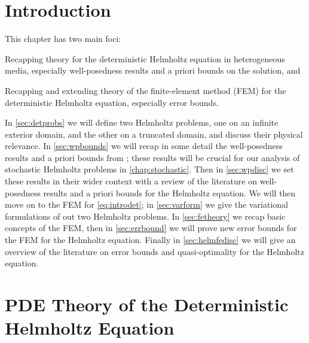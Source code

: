 \section{Introduction}
This chapter has two main foci:
\ben
\item Recapping theory for the deterministic Helmholtz equation in heterogeneous media, especially well-posedness results and a priori bounds on the solution, and
\item Recapping and extending theory of the finite-element method (FEM) for the deterministic Helmholtz equation, especially error bounds.
  \een


In \cref{sec:detprobs} we will define two Helmholtz problems, one on an infinite exterior domain, and the other on a truncated domain, and discuss their physical relevance. In \cref{sec:wpbounds} we will recap in some detail the well-posedness results and a priori bounds from \cite{GrPeSp:19}; these results will be crucial for our analysis of stochastic Helmholtz problems in \cref{chap:stochastic}. Then in \cref{sec:wpdisc} we set these results in their wider context with a review of the literature on well-posedness results and a priori bounds for the Helmholtz equation. We will then move on to the FEM for \eqref{eq:introdet}; in \cref{sec:varform} we give the variational formulations of out two Helmholtz problems. In \cref{sec:fetheory} we recap basic concepts of the FEM, then in \cref{sec:errbound} we will prove new error bounds for the FEM for the Helmholtz equation. Finally in \cref{sec:helmfedisc} we will give an overview of the literature on error bounds and quasi-optimality for the Helmholtz equation.


\section{PDE Theory of the Deterministic Helmholtz Equation}
  

